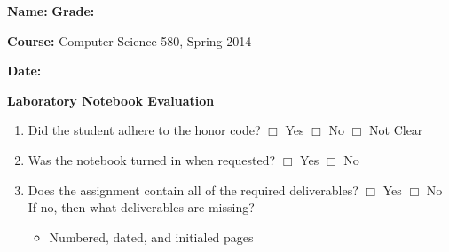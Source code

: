 \documentclass[letterpaper, 10pt]{article} %
\begin{document}
\pagestyle{empty}

\vspace*{-1in}

\noindent
{\bf Name:} \hspace*{4.8in} {\bf Grade:} 

\vspace*{.1in}

\noindent
{\bf Course:} Computer Science 580, Spring 2014 

\vspace*{.1in}

\noindent
{\bf Date:} 

\vspace*{.1in}

\large{

\begin{center}{\bf Laboratory Notebook Evaluation} \end{center}

\begin{enumerate}

\setlength{\itemsep}{.5pt}

\item Did the student adhere to the honor code? \hspace*{.05in}  $\Box$ Yes
  \hspace*{.05in} $\Box$ No \hspace*{.05in}  $\Box$ Not Clear

\item Was the notebook turned in when requested? \hspace*{.05in}  $\Box$ Yes
  \hspace*{.05in} $\Box$ No \hspace*{.05in} %

\item Does the assignment contain all of the required
  deliverables? \hspace*{.05in} $\Box$ Yes
  \hspace*{.05in} $\Box$ No \\ \hspace*{.05in} If no, then what
  deliverables are missing? \vspace*{-.05in}

\begin{itemize}
\renewcommand{\labelitemi}{$\Box$}

\setlength{\itemsep}{.5pt}

\item Numbered, dated, and initialed pages


\end{itemize}
\end{enumerate}}
\end{document}
